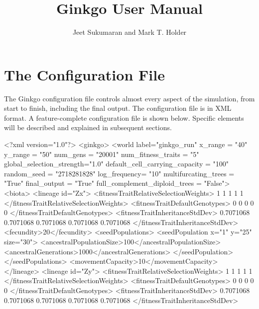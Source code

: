 \documentclass[11pt]{article}
\title{Ginkgo User Manual}
\author{Jeet Sukumaran and Mark T. Holder}
\date{}                                           %
\begin{document}
\maketitle

\part{The Configuration File}

The Ginkgo configuration file controls almost every aspect of the simulation, from start to finish, including the final output.
The configuration file is in XML format.
A feature-complete configuration file is shown below.
Specific elements will be described and explained in subsequent sections.
\begin{ginkgoxml}
<?xml version="1.0"?>
<ginkgo>
    <world label="ginkgo_run"
           x_range = "40"
           y_range = "50"
           num_gens = "20001"
           num_fitness_traits = "5"
           global_selection_strength="1.0"
           default_cell_carrying_capacity = "100"
           random_seed = "2718281828"
           log_frequency= "10"
           multifurcating_trees = "True"
           final_output = "True"
           full_complement_diploid_trees = "False">
        <biota>
            <lineage id="Zx">
                <fitnessTraitRelativeSelectionWeights>
                	1 1 1 1 1
                </fitnessTraitRelativeSelectionWeights>
                <fitnessTraitDefaultGenotypes>
                	0 0 0 0 0
                </fitnessTraitDefaultGenotypes>
                <fitnessTraitInheritanceStdDev>
                	0.7071068 0.7071068 0.7071068 0.7071068 0.7071068
                </fitnessTraitInheritanceStdDev>
                <fecundity>20</fecundity>
                <seedPopulations>
                    <seedPopulation x="1" y="25" size="30">
                        <ancestralPopulationSize>100</ancestralPopulationSize>
                        <ancestralGenerations>1000</ancestralGenerations>
                    </seedPopulation>
                </seedPopulations>
                <movementCapacity>10</movementCapacity>
            </lineage>
            <lineage id="Zy">
                <fitnessTraitRelativeSelectionWeights>
                	1 1 1 1 1
                </fitnessTraitRelativeSelectionWeights>
                <fitnessTraitDefaultGenotypes>
                	0 0 0 0 0
                </fitnessTraitDefaultGenotypes>
                <fitnessTraitInheritanceStdDev>
                	0.7071068 0.7071068 0.7071068 0.7071068 0.7071068
                </fitnessTraitInheritanceStdDev>

\end{ginkgoxml}
\end{document}
